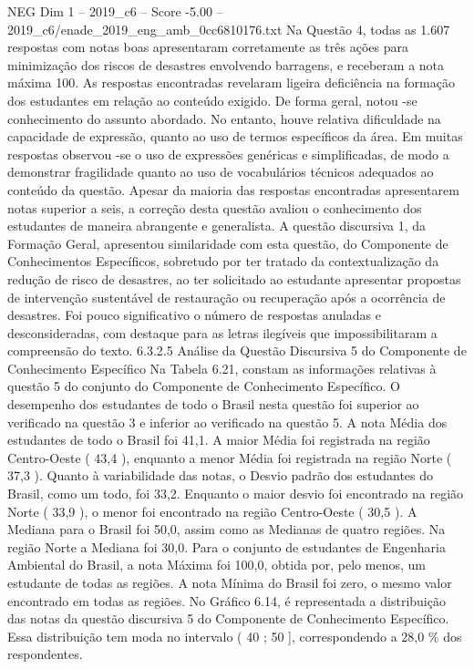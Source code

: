\begin{textsample}{NEG Dim 1 – 2019\_c6 – Score -5.00 – 2019\_c6/enade\_2019\_eng\_amb\_0cc6810176.txt}
Na Questão 4, todas as 1.607 respostas com notas boas apresentaram corretamente as três ações para minimização dos riscos de desastres envolvendo barragens, e receberam a nota máxima 100.
As respostas encontradas revelaram ligeira deficiência na formação dos estudantes em relação ao conteúdo exigido.
De forma geral, notou -se conhecimento do assunto abordado.
No entanto, houve relativa dificuldade na capacidade de expressão, quanto ao uso de termos específicos da área.
Em muitas respostas observou -se o uso de expressões genéricas e simplificadas, de modo a demonstrar fragilidade quanto ao uso de vocabulários técnicos adequados ao conteúdo da questão.
Apesar da maioria das respostas encontradas apresentarem notas superior a seis, a correção desta questão avaliou o conhecimento dos estudantes de maneira abrangente e generalista.
A questão discursiva 1, da Formação Geral, apresentou similaridade com esta questão, do Componente de Conhecimentos Específicos, sobretudo por ter tratado da contextualização da redução de risco de desastres, ao ter solicitado ao estudante apresentar propostas de intervenção sustentável de restauração ou recuperação após a ocorrência de desastres.
Foi pouco significativo o número de respostas anuladas e desconsideradas, com destaque para as letras ilegíveis que impossibilitaram a compreensão do texto. 6.3.2.5 Análise da Questão Discursiva 5 do Componente de Conhecimento Específico Na Tabela 6.21, constam as informações relativas à questão 5 do conjunto do Componente de Conhecimento Específico.
O desempenho dos estudantes de todo o Brasil nesta questão foi superior ao verificado na questão 3 e inferior ao verificado na questão 5.
A nota Média dos estudantes de todo o Brasil foi 41,1.
A maior Média foi registrada na região Centro-Oeste ( 43,4 ), enquanto a menor Média foi registrada na região Norte ( 37,3 ).
Quanto à variabilidade das notas, o Desvio padrão dos estudantes do Brasil, como um todo, foi 33,2.
Enquanto o maior desvio foi encontrado na região Norte ( 33,9 ), o menor foi encontrado na região Centro-Oeste ( 30,5 ).
A Mediana para o Brasil foi 50,0, assim como as Medianas de quatro regiões.
Na região Norte a Mediana foi 30,0.
Para o conjunto de estudantes de Engenharia Ambiental do Brasil, a nota Máxima foi 100,0, obtida por, pelo menos, um estudante de todas as regiões.
A nota Mínima do Brasil foi zero, o mesmo valor encontrado em todas as regiões.
No Gráfico 6.14, é representada a distribuição das notas da questão discursiva 5 do Componente de Conhecimento Específico.
Essa distribuição tem moda no intervalo ( 40 ; 50 ], correspondendo a 28,0 \% dos respondentes.

\end{textsample}
